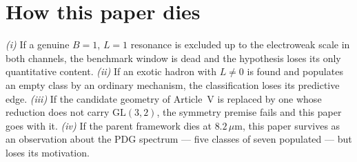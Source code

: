 \section{How this paper dies}
\emph{(i)} If a genuine $B=1$, $L=1$ resonance is excluded up to the electroweak scale in both channels, the benchmark window is dead and the hypothesis loses its only quantitative content. \emph{(ii)} If an exotic hadron with $L\neq0$ is found and populates an empty class by an ordinary mechanism, the classification loses its predictive edge. \emph{(iii)} If the candidate geometry of Article~V is replaced by one whose reduction does not carry $\mathrm{GL}(3,2)$, the symmetry premise fails and this paper goes with it. \emph{(iv)} If the parent framework dies at $8.2\,\mu$m, this paper survives as an observation about the PDG spectrum --- five classes of seven populated --- but loses its motivation.



\toolsstatement
{}



